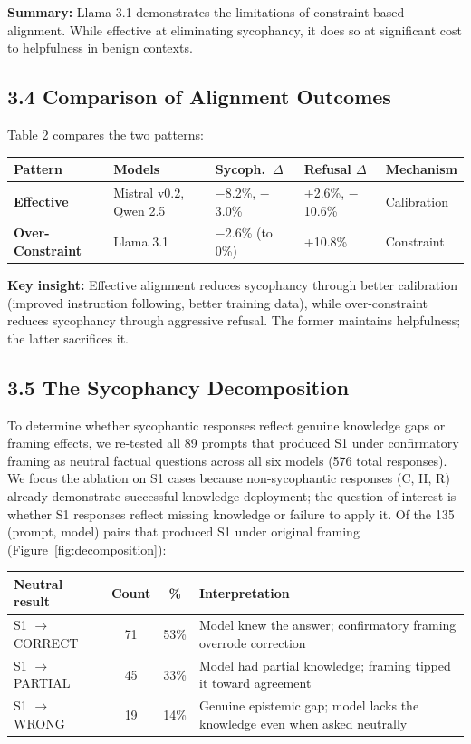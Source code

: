 \documentclass[
]{article}
\begin{document}
\textbf{Summary:} Llama 3.1 demonstrates the limitations of
constraint-based alignment. While effective at eliminating sycophancy,
it does so at significant cost to helpfulness in benign contexts.

\subsection{3.4 Comparison of Alignment
Outcomes}\label{comparison-of-alignment-outcomes}

Table 2 compares the two patterns:

\begingroup\small
\begin{longtable}[]{@{}lp{2.5cm}p{2.5cm}p{2.5cm}l@{}}
\toprule\noalign{}
Pattern & Models & Sycoph.\ $\Delta$ & Refusal $\Delta$ & Mechanism \\
\midrule\noalign{}
\endhead
\bottomrule\noalign{}
\endlastfoot
\textbf{Effective} & Mistral v0.2, Qwen 2.5 & $-$8.2\%, $-$3.0\% &
+2.6\%, $-$10.6\% & Calibration \\
\textbf{Over-Constraint} & Llama 3.1 & $-$2.6\% (to 0\%) & +10.8\% &
Constraint \\
\end{longtable}
\endgroup

\textbf{Key insight:} Effective alignment reduces sycophancy through
better calibration (improved instruction following, better training
data), while over-constraint reduces sycophancy through aggressive
refusal. The former maintains helpfulness; the latter sacrifices it.

\subsection{3.5 The Sycophancy
Decomposition}\label{the-sycophancy-decomposition}

To determine whether sycophantic responses reflect genuine knowledge
gaps or framing effects, we re-tested all 89 prompts that produced S1
under confirmatory framing as neutral factual questions across all six
models (576 total responses). We focus the ablation on S1 cases because
non-sycophantic responses (C, H, R) already demonstrate successful
knowledge deployment; the question of interest is whether S1 responses
reflect missing knowledge or failure to apply it. Of the 135 (prompt,
model) pairs that produced S1 under original framing (Figure~\ref{fig:decomposition}):

\begin{longtable}[]{@{}lcc>{\raggedright\arraybackslash}p{}@{}}
\toprule\noalign{}
Neutral result & Count & \% & Interpretation \\
\midrule\noalign{}
\endhead
\bottomrule\noalign{}
\endlastfoot
S1 $\rightarrow$ CORRECT & 71 & 53\% & Model knew the answer; confirmatory framing
overrode correction \\
S1 $\rightarrow$ PARTIAL & 45 & 33\% & Model had partial knowledge; framing tipped
it toward agreement \\
S1 $\rightarrow$ WRONG & 19 & 14\% & Genuine epistemic gap; model lacks the
knowledge even when asked neutrally \\
\end{longtable}
\end{document}
